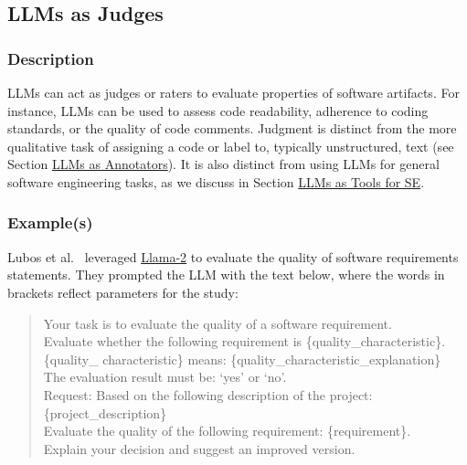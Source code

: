 \subsection{LLMs as Judges}

\subsubsection{Description}

LLMs can act as judges or raters to evaluate properties of software artifacts. %
For instance, LLMs can be used to assess code readability, adherence to coding standards, or the quality of code comments.
Judgment is distinct from the more qualitative task of assigning a code or label to, typically unstructured, text (see Section \href{/study-types/#llms-as-annotators}{LLMs as Annotators}).
It is also distinct from using LLMs for general software engineering tasks, as we discuss in Section \href{/study-types/#introduction-llms-as-tools-for-software-engineers}{LLMs as Tools for SE}.

\subsubsection{Example(s)}

Lubos et al.~\cite{DBLP:conf/re/LubosFTGMEL24} leveraged \href{https://www.llama.com/llama2/}{Llama-2} to evaluate the quality of software requirements statements. 
They prompted the LLM with the text below, where the words in brackets reflect parameters for the study:

\begin{quote}
Your task is to evaluate the quality of a software requirement.\\
Evaluate whether the following requirement is \{quality\_characteristic\}. \\
\{quality\_ characteristic\} means: \{quality\_characteristic\_explanation\}\\
The evaluation result must be: `yes' or `no'.\\
Request: Based on the following description of the project:
\{project\_description\}\\
Evaluate the quality of the following requirement: \{requirement\}.\\
Explain your decision and suggest an improved version.\\
\end{quote}

